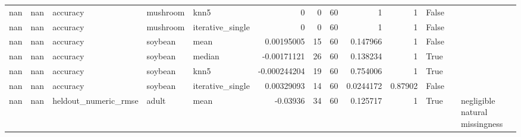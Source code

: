 \begin{table}[ht]
{\begin{tabular}{rrlllrrrrrlll}
        nan &     nan & accuracy                       & mushroom       & knn5             &      0           &                   0 &      60 & 1           & 1           & False              &                                                                                                                    &                                                                       \\
        nan &     nan & accuracy                       & mushroom       & iterative\_single &      0           &                   0 &      60 & 1           & 1           & False              &                                                                                                                    &                                                                       \\
        nan &     nan & accuracy                       & soybean        & mean             &      0.00195005  &                  15 &      60 & 0.147966    & 1           & False              &                                                                                                                    &                                                                       \\
        nan &     nan & accuracy                       & soybean        & median           &     -0.00171121  &                  26 &      60 & 0.138234    & 1           & True               &                                                                                                                    &                                                                       \\
        nan &     nan & accuracy                       & soybean        & knn5             &     -0.000244204 &                  19 &      60 & 0.754006    & 1           & True               &                                                                                                                    &                                                                       \\
        nan &     nan & accuracy                       & soybean        & iterative\_single &      0.00329093  &                  14 &      60 & 0.0244172   & 0.87902     & False              &                                                                                                                    &                                                                       \\
        nan &     nan & heldout\_numeric\_rmse           & adult          & mean             &     -0.03936     &                  34 &      60 & 0.125717    & 1           & True               &                                                                                                                    & negligible natural missingness                                        \\

\end{tabular}}
\end{table}
